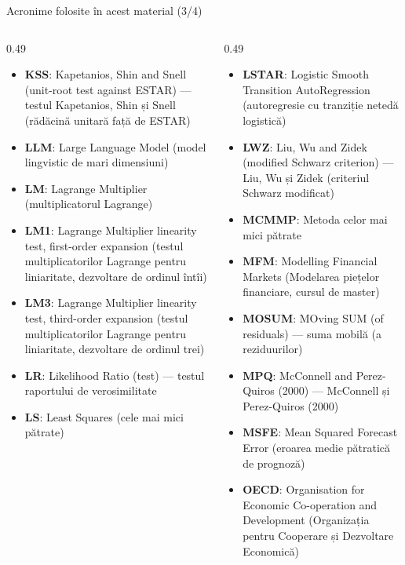 \begin{frame}{Acronime folosite în acest material (3/4)}
\begin{columns}[T]
\begin{column}{0.49\textwidth}
\begin{itemize}\setlength{\itemsep}{0pt}
    \item \textbf{KSS}: Kapetanios, Shin and Snell (unit-root test against ESTAR) — testul Kapetanios, Shin și Snell (rădăcină unitară față de ESTAR)
    \item \textbf{LLM}: Large Language Model (model lingvistic de mari dimensiuni)
    \item \textbf{LM}: Lagrange Multiplier (multiplicatorul Lagrange)
    \item \textbf{LM1}: Lagrange Multiplier linearity test, first-order expansion (testul multiplicatorilor Lagrange pentru liniaritate, dezvoltare de ordinul întîi)
    \item \textbf{LM3}: Lagrange Multiplier linearity test, third-order expansion (testul multiplicatorilor Lagrange pentru liniaritate, dezvoltare de ordinul trei)
    \item \textbf{LR}: Likelihood Ratio (test) — testul raportului de verosimilitate
    \item \textbf{LS}: Least Squares (cele mai mici pătrate)
\end{itemize}
\end{column}
\begin{column}{0.49\textwidth}
\begin{itemize}\setlength{\itemsep}{0pt}
    \item \textbf{LSTAR}: Logistic Smooth Transition AutoRegression (autoregresie cu tranziție netedă logistică)
    \item \textbf{LWZ}: Liu, Wu and Zidek (modified Schwarz criterion) — Liu, Wu și Zidek (criteriul Schwarz modificat)
    \item \textbf{MCMMP}: Metoda celor mai mici pătrate
    \item \textbf{MFM}: Modelling Financial Markets (Modelarea piețelor financiare, cursul de master)
    \item \textbf{MOSUM}: MOving SUM (of residuals) — suma mobilă (a reziduurilor)
    \item \textbf{MPQ}: McConnell and Perez-Quiros (2000) — McConnell și Perez-Quiros (2000)
    \item \textbf{MSFE}: Mean Squared Forecast Error (eroarea medie pătratică de prognoză)
    \item \textbf{OECD}: Organisation for Economic Co-operation and Development (Organizația pentru Cooperare și Dezvoltare Economică)
\end{itemize}
\end{column}
\end{columns}
\end{frame}
